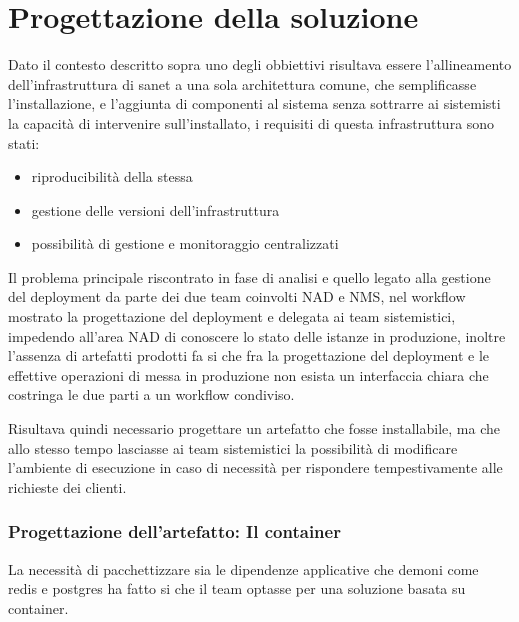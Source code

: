 \chapter{Progettazione della soluzione}

Dato il contesto descritto sopra uno degli obbiettivi risultava essere l'allineamento dell'infrastruttura di sanet a una sola architettura comune, che semplificasse l'installazione, e l'aggiunta di componenti al sistema senza sottrarre ai sistemisti la capacità di intervenire sull'installato, i requisiti di questa infrastruttura sono stati:

\begin{itemize}
\item{riproducibilità della stessa}
\item{gestione delle versioni dell'infrastruttura}
\item{possibilità di gestione e monitoraggio centralizzati}
\end{itemize}

Il problema principale riscontrato in fase di analisi e quello legato alla gestione del deployment da parte dei due team coinvolti NAD e NMS, nel workflow mostrato la progettazione del deployment e delegata ai team sistemistici, impedendo all'area NAD di conoscere lo stato delle istanze in produzione, inoltre l'assenza di artefatti prodotti fa si che fra la progettazione del deployment e le effettive operazioni di messa in produzione non esista un interfaccia chiara che costringa le due parti a un workflow condiviso.

Risultava quindi necessario progettare un artefatto che fosse installabile, ma che allo stesso tempo lasciasse ai team sistemistici la possibilità di modificare l'ambiente di esecuzione in caso di necessità per rispondere tempestivamente alle richieste dei clienti.

\newpage
\subsection{Progettazione dell'artefatto: Il container}

La necessità di pacchettizzare sia le dipendenze applicative che demoni come redis e postgres ha fatto si che il team optasse per una soluzione basata su container.

